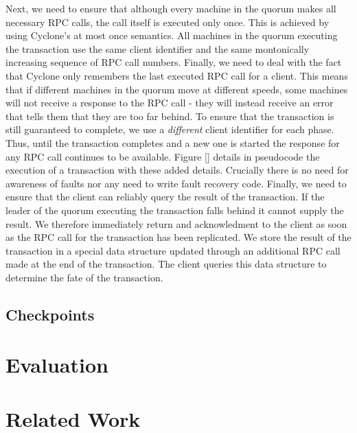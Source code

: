 \documentclass[twocolumn]{article}
\begin{document}
Next, we need to ensure that although every machine in the quorum makes all
necessary RPC calls, the call itself is executed only once. This is achieved by
using Cyclone's at most once semantics. All machines in the quorum executing the
transaction use the same client identifier and the same montonically increasing
sequence of RPC call numbers. Finally, we need to deal with the fact that
Cyclone only remembers the last executed RPC call for a client. This means that
if different machines in the quorum move at different speeds, some machines will
not receive a response to the RPC call - they will instead receive an error that
tells them that they are too far behind. To ensure that the transaction is still
guaranteed to complete, we use a \emph{different} client identifier for each
phase. Thus, until the transaction completes and a new one is started the
response for any RPC call continues to be available. Figure [] details in
pseudocode the execution of a transaction with these added details. Crucially
there is no need for awareness of faults nor any need to write fault recovery
code. Finally, we need to ensure that the client can reliably query the result
of the transaction. If the leader of the quorum executing the transaction falls
behind it cannot supply the result. We therefore immediately return and
acknowledment to the client as soon as the RPC call for the transaction has been
replicated. We store the result of the transaction in a special data structure
updated through an additional RPC call made at the end of the transaction. The
client queries this data structure to determine the fate of the transaction.

\subsection{Checkpoints}

\section{Evaluation}

\section{Related Work}
\end{document}
